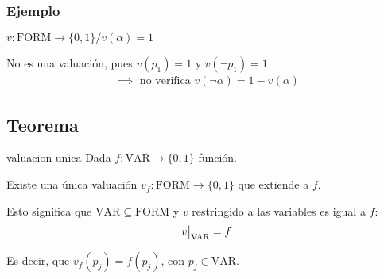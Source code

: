 \subsubsection{Ejemplo}
$v: \mathrm{FORM} \to \{ 0,1 \} / v(\alpha) = 1$ 

No es una valuación, pues $v(p_1)=1$ y $v(\neg p_1) = 1$
\begin{gather*}
    \implies \text{ no verifica } v(\neg \alpha)=1-v(\alpha)
\end{gather*}

\subsection{Teorema}

\begin{teorema}{}{valuacion-unica}
    Dada $f: \mathrm{VAR}\to \{ 0,1 \}$ función.

    \medskip

    Existe una única valuación
    $v_f: \mathrm{FORM} \to \{ 0,1 \}$ que extiende a $f$.
\end{teorema}

Esto significa que $\mathrm{VAR} \subseteq \mathrm{FORM}$ y $v$ restringido
a las variables es igual a $f$:
\begin{gather*}
    \frest{v}{\mathrm{VAR}} = f
\end{gather*}

Es decir, que $v_f(p_j) = f(p_j)$, con $p_j \in \mathrm{VAR}$.


